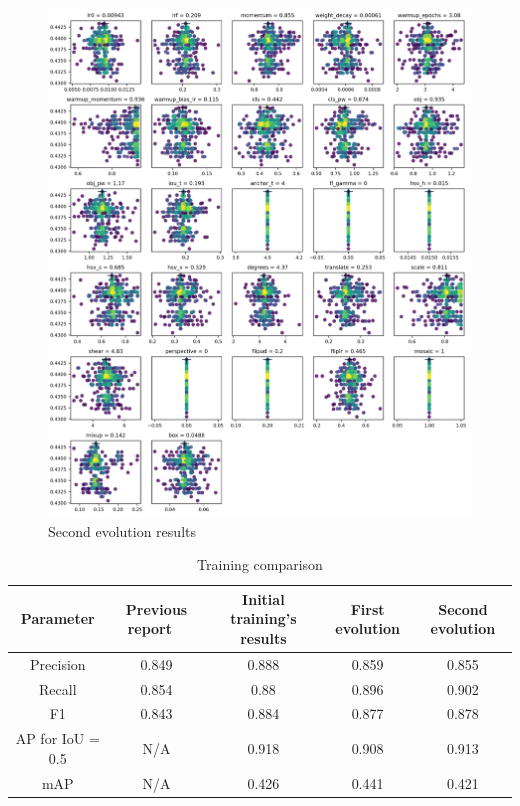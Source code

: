 \documentclass{article}
\begin{document}
\begin{figure}[!ht]
  \centering
  \includegraphics[scale=0.9]{evolution/evol2.png}
  \caption{Second evolution results}
  \label{Figure 21}
\end{figure}

\newpage

\begin{table}[h!]
\centering
\begin{tabular}{|c|c|c|c|c|} 
 \hline
 Parameter &  Previous report ~\cite{stefano} & Initial training's results & First evolution & Second evolution \\ [0.5ex] 
 \hline\hline
 Precision & 0.849 & 0.888 & 0.859 & 0.855 \\ 
 Recall & 0.854 & 0.88& 0.896& 0.902 \\
 F1 & 0.843 & 0.884 & 0.877 & 0.878 \\
 AP for IoU = 0.5 & N/A & 0.918 & 0.908 & 0.913 \\
 mAP & N/A & 0.426 & 0.441 & 0.421 \\ [1ex] 
 \hline
\end{tabular}
\caption{Training comparison}
\label{Table 5}
\end{table}
\end{document}
